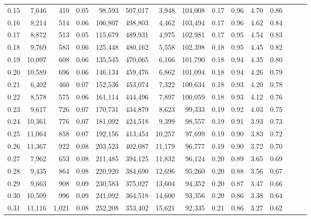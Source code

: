 \begin{tabular}{rrrrrrrrrrrrrrr}
0.15 &   7,646 &    410 &  0.05 &   98,593 &  507,017 &    3,948 &  104,008 &  0.17 &  0.96 &  4.70 &      0.86 \\
0.16 &   8,214 &    514 &  0.06 &  106,807 &  498,803 &    4,462 &  103,494 &  0.17 &  0.96 &  4.62 &      0.84 \\
0.17 &   8,872 &    513 &  0.05 &  115,679 &  489,931 &    4,975 &  102,981 &  0.17 &  0.95 &  4.54 &      0.83 \\
0.18 &   9,769 &    583 &  0.06 &  125,448 &  480,162 &    5,558 &  102,398 &  0.18 &  0.95 &  4.45 &      0.82 \\
0.19 &  10,097 &    608 &  0.06 &  135,545 &  470,065 &    6,166 &  101,790 &  0.18 &  0.94 &  4.35 &      0.80 \\
0.20 &  10,589 &    696 &  0.06 &  146,134 &  459,476 &    6,862 &  101,094 &  0.18 &  0.94 &  4.26 &      0.79 \\
0.21 &   6,402 &    460 &  0.07 &  152,536 &  453,074 &    7,322 &  100,634 &  0.18 &  0.93 &  4.20 &      0.78 \\
0.22 &   8,578 &    575 &  0.06 &  161,114 &  444,496 &    7,897 &  100,059 &  0.18 &  0.93 &  4.12 &      0.76 \\
0.23 &   9,617 &    726 &  0.07 &  170,731 &  434,879 &    8,623 &   99,333 &  0.19 &  0.92 &  4.03 &      0.75 \\
0.24 &  10,361 &    776 &  0.07 &  181,092 &  424,518 &    9,399 &   98,557 &  0.19 &  0.91 &  3.93 &      0.73 \\
0.25 &  11,064 &    858 &  0.07 &  192,156 &  413,454 &   10,257 &   97,699 &  0.19 &  0.90 &  3.83 &      0.72 \\
0.26 &  11,367 &    922 &  0.08 &  203,523 &  402,087 &   11,179 &   96,777 &  0.19 &  0.90 &  3.72 &      0.70 \\
0.27 &   7,962 &    653 &  0.08 &  211,485 &  394,125 &   11,832 &   96,124 &  0.20 &  0.89 &  3.65 &      0.69 \\
0.28 &   9,435 &    864 &  0.08 &  220,920 &  384,690 &   12,696 &   95,260 &  0.20 &  0.88 &  3.56 &      0.67 \\
0.29 &   9,663 &    908 &  0.09 &  230,583 &  375,027 &   13,604 &   94,352 &  0.20 &  0.87 &  3.47 &      0.66 \\
0.30 &  10,509 &    996 &  0.09 &  241,092 &  364,518 &   14,600 &   93,356 &  0.20 &  0.86 &  3.38 &      0.64 \\
0.31 &  11,116 &  1,021 &  0.08 &  252,208 &  353,402 &   15,621 &   92,335 &  0.21 &  0.86 &  3.27 &      0.62 \\

\end{tabular}
